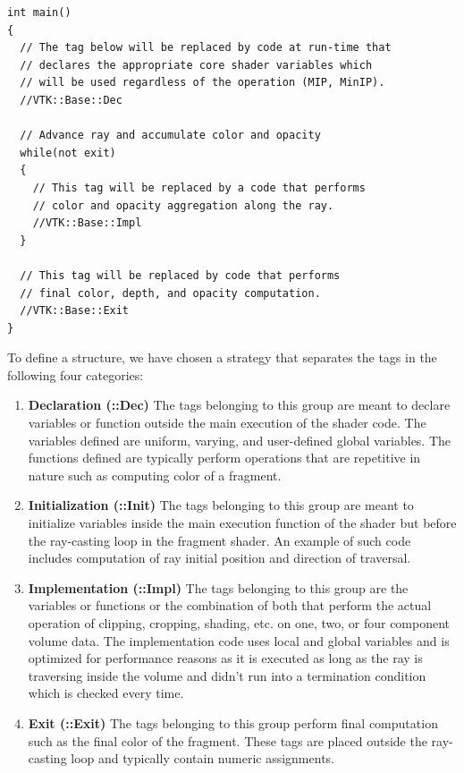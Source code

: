 \begin{lstlisting}[caption={Base fragment shader code template for dynamic
                            shader generation using pre-defined tags},
                   label=lst:skeletonshader]
int main()
{
  // The tag below will be replaced by code at run-time that
  // declares the appropriate core shader variables which
  // will be used regardless of the operation (MIP, MinIP).
  //VTK::Base::Dec

  // Advance ray and accumulate color and opacity
  while(not exit)
  {
    // This tag will be replaced by a code that performs
    // color and opacity aggregation along the ray.
    //VTK::Base::Impl
  }

  // This tag will be replaced by code that performs
  // final color, depth, and opacity computation.
  //VTK::Base::Exit
}
\end{lstlisting}

To define a structure, we have chosen a strategy that separates the tags in
the following four categories:

\begin{enumerate}
\label{enu:shadertags}
  \item \textbf{Declaration (::Dec)} The tags belonging to this group are meant
    to declare variables or function outside the main execution of the shader
    code.  The variables defined are uniform, varying, and user-defined global
    variables.  The functions defined are typically perform operations that are
    repetitive in nature such as computing color of a fragment.

  \item \textbf{Initialization (::Init)} The tags belonging to this group are
    meant to initialize variables inside the main execution function of the
    shader but before the ray-casting loop in the fragment shader. An example of
    such code includes computation of ray initial position and direction
    of traversal.

  \item \textbf{Implementation (::Impl)} The tags belonging to this group are
    the variables or functions or the combination of both that perform the
    actual operation of clipping, cropping, shading, etc. on one, two, or four
    component volume data.  The implementation code uses local and global
    variables and is optimized for performance reasons as it is executed as long
    as the ray is traversing inside the volume and didn't run into a termination
    condition which is checked every time.

  \item \textbf{Exit (::Exit)} The tags belonging to this group perform final
    computation such as the final color of the fragment. These tags are placed
    outside the ray-casting loop and typically contain numeric assignments.
\end{enumerate}

